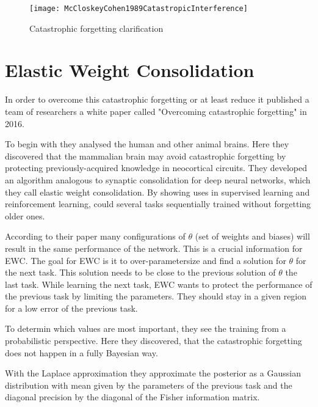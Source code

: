 \begin{figure}[H]
    \centering
    \texttt{[image: McCloskeyCohen1989CatastropicInterference]}
    \caption{\cite[page 148]{psychology_learning_mccloskey_cohen} Catastrophic forgetting clarification}
    \label{fig:catastrophic_forgetting_clarification}
\end{figure}


\section{Elastic Weight Consolidation}

In order to overcome this catastrophic forgetting or at least reduce it published a team of researchers a white paper called "Overcoming catastrophic forgetting" in 2016.
\cite{elastic-weight-consolidation}

To begin with they analysed the human and other animal brains.
Here they discovered that the mammalian brain may avoid catastrophic forgetting by protecting previously-acquired knowledge in neocortical circuits.
They developed an algorithm analogous to synaptic consolidation for deep neural networks, which they call elastic weight consolidation.
By showing uses in supervised learning and reinforcement learning, could several tasks sequentially trained without forgetting older ones.
\cite{elastic-weight-consolidation}

According to their paper many configurations of $\theta$ (set of weights and biases) will result in the same performance of the network.
This is a crucial information for EWC.
The goal for EWC is it to over-parametersize and find a solution for $\theta$ for the next task.
This solution needs to be close to the previous solution of $\theta$ the last task.
While learning the next task, EWC wants to protect the performance of the previous task by limiting the parameters.
They should stay in a given region for a low error of the previous task.
\cite{elastic-weight-consolidation}

To determin which values are most important, they see the training from a probabilistic perspective.
Here they discovered, that the catastrophic forgetting does not happen in a fully Bayesian way.
\cite{elastic-weight-consolidation}


With the Laplace approximation they approximate the posterior as a Gaussian distribution with mean given by the parameters of the previous task and the diagonal precision by the diagonal of the Fisher information matrix.
\cite{elastic-weight-consolidation}

